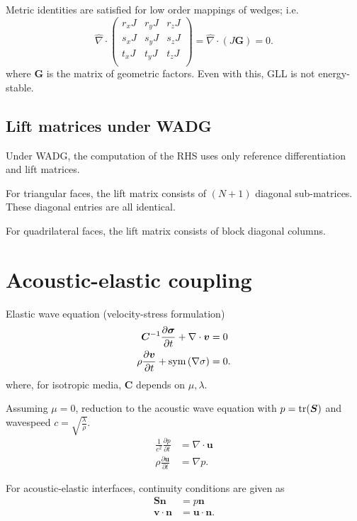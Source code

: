\documentclass{siamart0216}
\newcommand{\pd}[2]{\frac{\partial#1}{\partial#2}}
\newcommand{\LRp}[1]{\left( #1 \right)}
\newcommand{\Grad} {\ensuremath{\nabla}}
\newcommand{\Div} {\ensuremath{\nabla\cdot}}
\begin{document}
Metric identities are satisfied for low order mappings of wedges; i.e. 
\[
\widehat{\Grad}\cdot \LRp{
\begin{array}{ccc}
r_x J & r_y J & r_z J\\
s_x J & s_y J & s_z J\\
t_x J & t_y J & t_z J\\
\end{array}
} = \widehat{\Grad}\cdot (J\bm{G}) = 0.
\]
where $\bm{G}$ is the matrix of geometric factors.  Even with this, GLL is not energy-stable.  


\subsection{Lift matrices under WADG}

Under WADG, the computation of the RHS uses only reference differentiation and lift matrices.  

For triangular faces, the lift matrix consists of $(N+1)$ diagonal sub-matrices.  These diagonal entries are all identical.  

For quadrilateral faces, the lift matrix consists of block diagonal columns.  

\section{Acoustic-elastic coupling}

Elastic wave equation (velocity-stress formulation)
\begin{align*}
\bm{C}^{-1}\pd{\bm{\sigma}}{t} + \Div\bm{v} &= 0\\
\rho\pd{\bm{v}}{t} + {\rm sym}\LRp{\Grad \sigma} &= 0.
\end{align*}
where, for isotropic media, $\bm{C}$ depends on $\mu,\lambda$.

Assuming $\mu = 0$, reduction to the acoustic wave equation with $p = {\rm tr}(\bm{S})$ and wavespeed $c = \sqrt{\frac{\lambda}{\rho}}$.
\begin{align*}
\frac{1}{c^2}\pd{p}{t} &= \Div\bm{u}\\
\rho\pd{\bm{u}}{t} &= \Grad p.
\end{align*}

For acoustic-elastic interfaces, continuity conditions are given as
\begin{align*}
\bm{S}\bm{n} &= p\bm{n}\\
\bm{v}\cdot \bm{n} &= \bm{u}\cdot \bm{n}.
\end{align*}
\end{document}
